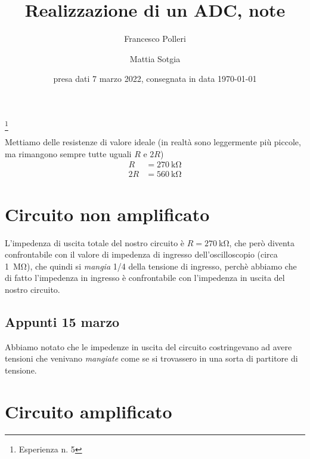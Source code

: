 \documentclass[
    rmp,
    reprint, 
    superscriptaddress, 
    altaffilletter, 
    amsmath, 
    amssymb, 
    a4paper]{revtex4-2}
\begin{document}
\title{
    Realizzazione di un ADC, note
}
\thanks{Esperienza n. 5
}

\author{Francesco Polleri}
\author{Mattia Sotgia}


\date{presa dati
    7 marzo 2022, consegnata in data 
    \today
}

\begin{abstract}

\end{abstract}
\maketitle
\thispagestyle{fancy}


Mettiamo delle resistenze di valore ideale (in realtà sono leggermente più piccole, ma rimangono sempre tutte uguali $R$ e $2R$) \begin{align*}
    R &= \SI{270}{\kilo\ohm}\\
    2R &= \SI{560}{\kilo\ohm}
\end{align*}
    
\section{Circuito non amplificato}
L'impedenza di uscita totale del nostro circuito è $R = \SI{270}{\kilo\ohm}$, che però diventa confrontabile con il valore di impedenza di ingresso dell'oscilloscopio (circa \SI[]{1}[]{\mega\ohm}), che quindi si \emph{mangia} 1/4 della tensione di ingresso, perchè abbiamo che di fatto l'impedenza in ingresso è confrontabile con l'impedenza in uscita del nostro circuito.

\subsection{Appunti 15 marzo}
Abbiamo notato che le impedenze in uscita del circuito costringevano ad avere tensioni che venivano \emph{mangiate} come se si trovassero in una sorta di partitore di tensione.

\section{Circuito amplificato}
\end{document}
